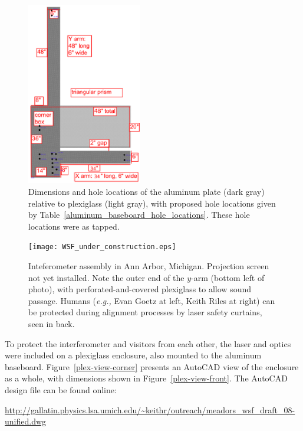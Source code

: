         \begin{figure}
        \begin{center}
        \includegraphics[height=80mm, width=50mm]{view-top-plate-3.eps}
        \caption{Dimensions and hole locations of the aluminum plate (dark gray) relative to plexiglass (light gray), with proposed hole locations given by Table~\ref{aluminum_baseboard_hole_locations}. These hole locations were as tapped.}
        \label{al_top_plate}
        \end{center}
        \end{figure}


	\begin{figure}
	\begin{center}
	\texttt{[image: WSF\_under\_construction.eps]}
	\caption{Inteferometer assembly in Ann Arbor, Michigan. Projection screen not yet installed. Note the outer end of the $y$-arm (bottom left of photo), with perforated-and-covered plexiglass to allow sound passage. Humans (\textit{e.g.,} Evan Goetz at left, Keith Riles at right) can be protected during alignment processes by laser safety curtains, seen in back.}
	\label{WSF_in_AA}
	\end{center}
	\end{figure}

To protect the interferometer and visitors from each other, the laser and optics were included on a plexiglass enclosure, also mounted to the aluminum baseboard.
Figure~\ref{plex-view-corner} presents an AutoCAD view of the enclosure as a whole, with dimensions shown in Figure~\ref{plex-view-front}. 
The AutoCAD design file can be found online:

\url{http://gallatin.physics.lsa.umich.edu/~keithr/outreach/meadors_wsf_draft_08-unified.dwg}

